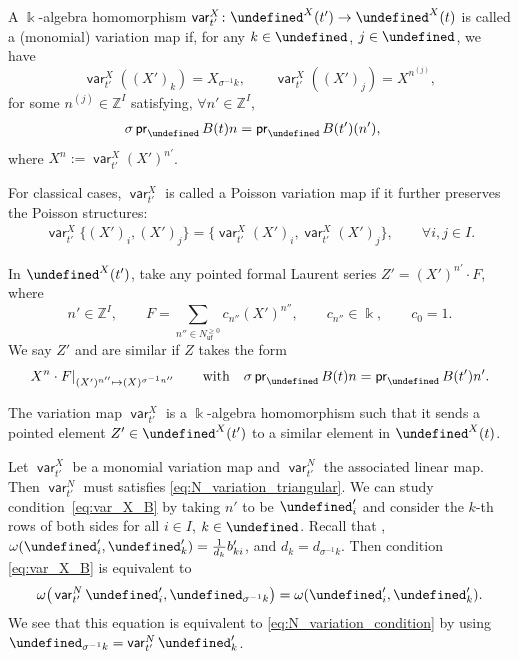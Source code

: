 \documentclass[10pt,a4paper]{amsart}
\newcommand{\kk}{\Bbbk}
\newcommand{\Z}{\mathbb{Z}}
\newcommand{\opname}[1]{\operatorname{\mathsf{#1}}}
\newcommand{\pr}{\opname{pr}}
\newcommand{\var}{\opname{var}}
\newcommand{\fv}{\opname{f}}
\newcommand{\ufv}{\opname{uf}}
\let\Iufv\undefined
\let\Ifv\undefined
\let\LP\undefined
\let\hLP\undefined
\let\ee\undefined
\newcommand{\Iufv}{I_{\ufv}}
\newcommand{\Ifv}{I_{\fv}}
\newcommand{\LP}{{\mathcal{LP}}}
\newcommand{\hLP}{\widehat{\mathcal{LP}}}
\newcommand{\ee}{\mathbf{e}}
\numberwithin{equation}{section}
\begin{document}
\begin{Definition}\label{def:X_variation_map}
 A $\kk$-algebra homomorphism $\var_{t'}^X\colon\LP^{X}(t')\rightarrow \LP^{X}(t)$ is called a (monomial) variation map if, for any $k\in \Iufv$, $j\in \Ifv$, we have
 \begin{equation*}%
 \var_{t'}^{X}((X')_k) = X_{\sigma^{-1}k},\qquad
 \var_{t'}^{X}((X')_{j}) = X^{n^{(j)}},
 \end{equation*}
 for some $n^{(j)}\in \Z^I$ satisfying, $\forall n'\in \Z^{I}$,
 \begin{align}\label{eq:var_X_B}
 \sigma \pr_{\Iufv} B(t) n&=\pr_{\Iufv}B(t')(n'),
 \end{align}
 where $X^n:=\var_{t'}^X (X')^{n'}$.

 For classical cases, $\var_{t'}^{X}$ is called a Poisson variation map if it further preserves
 the Poisson structures:
 \begin{align*}
 \var_{t'}^{X}\{(X')_{i},(X')_{j}\} =\bigl\{\var_{t'}^{X}(X')_{i},\var_{t'}^{X}(X')_{j}\bigr\},\qquad\forall i,j\in I.
 \end{align*}
\end{Definition}

\begin{Definition}
 In $\hLP^X(t')$, take any pointed formal Laurent series $Z'=(X')^{n'} \cdot F$, where
 \[n'\in \Z^I, \qquad F=\sum_{n''\in N_{\ufv}^{\geq 0}} c_{n''} (X')^{n''}, \qquad c_{n''}\in \kk, \qquad c_0=1.\] We say $Z'$ and \smash{$Z\in \hLP^X(t)$} are similar if $Z$ takes the form \[X^{n}\cdot F|_{(X')^{n''}\mapsto (X)^{\sigma^{-1} n''}}\qquad \text{with}\quad \sigma \pr_{\Iufv}B(t)n=\pr_{\Iufv}B(t')n'.\]
\end{Definition}

\begin{Remark}\label{rem:X-variation_map_pointed_elements}
 The variation map $\var_{t'}^X$ is a $\kk$-algebra homomorphism such that it sends a pointed element $Z'\in \LP^X(t')$ to a similar element in $\LP^X(t)$.
\end{Remark}

\begin{Remark}\label{rem:variation_X_N_translation}
 Let $\var^X_{t'}$ be a monomial variation map and $\var^N_{t'}$ the associated linear map. Then $\var^N_{t'}$ must satisfies \eqref{eq:N_variation_triangular}. We can study condition~\eqref{eq:var_X_B} by taking $n'$ to be $\ee_i'$ and consider the $k$-th rows of both sides for all $i\in I$, $k\in \Iufv$. Recall that \smash{$\omega(n,\ee_{\sigma^{-1}k})=\frac{1}{d_{\sigma^{-1}k}}(B n)_{\sigma^{-1}k}$}, $\omega(\ee'_i,\ee'_k)=\frac{1}{d_k}b'_{ki}$, and $d_k=d_{\sigma^{-1} k}$. Then condition \eqref{eq:var_X_B} is equivalent to
\begin{align*}
 \omega\big(\var^N_{t'}\ee_i',\ee_{\sigma^{-1} k}\big)=\omega(\ee_i',\ee_k').
\end{align*}
We see that this equation is equivalent to \eqref{eq:N_variation_condition} by using $\ee_{\sigma^{-1} k}=\var^N_{t'}\ee_k'$.
\end{Remark}
\end{document}
